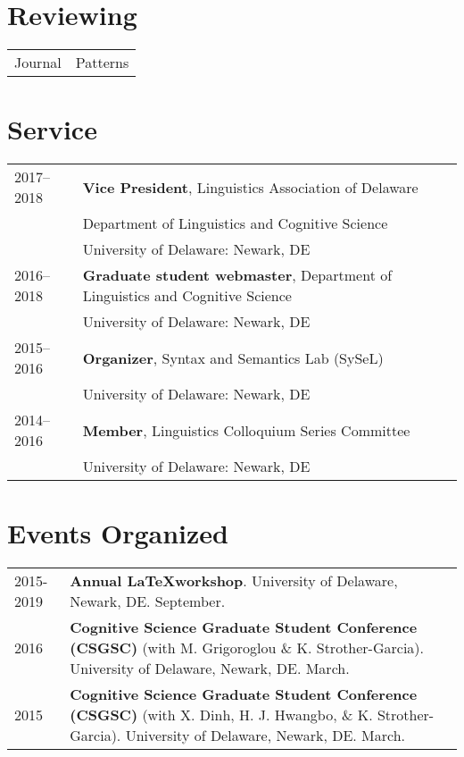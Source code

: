 \documentclass[11pt]{article} %
\begin{document}
\section*{Reviewing}

\begin{tabular}{p{1in} p{5.3in}}
	Journal & Patterns \\
\end{tabular}


\section*{Service}

\begin{longtable}{p{1in} p{5.3in}}
	2017--2018 & \textbf{Vice President}, Linguistics Association of Delaware \\
	& Department of Linguistics and Cognitive Science \\ 
	& University of Delaware: Newark, DE \\[5pt]
2016--2018 & \textbf{Graduate student webmaster}, Department of Linguistics and Cognitive Science \\ 
 & University of Delaware: Newark, DE \\[5pt]
2015--2016 & \textbf{Organizer}, Syntax and Semantics Lab (SySeL) \\
& University of Delaware: Newark, DE \\ [5pt]
2014--2016 & \textbf{Member}, Linguistics Colloquium Series Committee \\
& University of Delaware: Newark, DE \\ 
\end{longtable}

\section*{Events Organized}
\begin{longtable}{p{1in} p{5.3in}}
	2015-2019 & \textbf{Annual \LaTeX workshop}. University of Delaware, Newark, DE. September. \\ [5pt]
2016 &   \textbf{Cognitive Science Graduate Student Conference (CSGSC)} (with M. Grigoroglou
\& K. Strother-Garcia).  University of Delaware, Newark, DE.  March. \\ [5pt]
2015 &  \textbf{Cognitive Science Graduate Student Conference (CSGSC)} (with X. Dinh, H. J. Hwangbo, 
\& K. Strother-Garcia).  University of Delaware, Newark, DE.  March. \\ [5pt]
\end{longtable}
\end{document}
